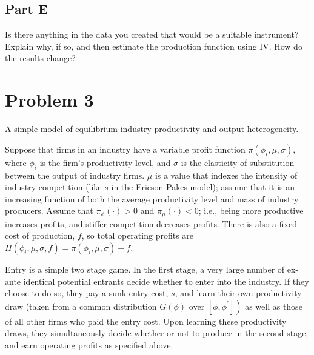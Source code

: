 \documentclass[10pt]{article}
\begin{document}
\subsection{Part E}

Is there anything in the data you created that would be a suitable instrument? Explain why, if so, and then estimate the production function using IV. How do the results change?

\hrulefill\hspace{0.5em}\dotfill\hspace{0.5em}\hrulefill



\section{Problem 3}

A simple model of equilibrium industry productivity and output heterogeneity.

Suppose that firms in an industry have a variable profit function $\pi\left(\phi_i, \mu, \sigma\right)$, where $\phi_i$ is the firm's productivity level, and $\sigma$ is the elasticity of substitution between the output of industry firms. $\mu$ is a value that indexes the intensity of industry competition (like $s$ in the Ericson-Pakes model); assume that it is an increasing function of both the average productivity level and mass of industry producers. Assume that $\pi_\phi(\cdot)>0$ and $\pi_\mu(\cdot)<0$; i.e., being more productive increases profits, and stiffer competition decreases profits. There is also a fixed cost of production, $f$, so total operating profits are $\Pi\left(\phi_i, \mu, \sigma, f\right)=\pi\left(\phi_i, \mu, \sigma\right)-f$.

Entry is a simple two stage game. In the first stage, a very large number of ex-ante identical potential entrants decide whether to enter into the industry. If they choose to do so, they pay a sunk entry cost, $s$, and learn their own productivity draw (taken from a common distribution $G(\phi)$ over $\left.\left[\phi, \phi^{\prime}\right]\right)$ as well as those of all other firms who paid the entry cost. Upon learning these productivity draws, they simultaneously decide whether or not to produce in the second stage, and earn operating profits as specified above.
\end{document}
